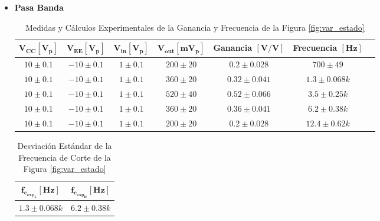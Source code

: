 \begin{itemize}
            \item \textbf{Pasa Banda}
            
            \begin{table}[H]
              \centering
              \begin{tabular}{|c|c|c|c|c|c|c|}
                \hline
                $\mathbf{V_{CC} [V_p]}$ & $\mathbf{V_{EE} [V_p]}$ & $\mathbf{V_{in} [V_p]}$ & $\mathbf{V_{out} [mV_p]}$ & \textbf{Ganancia} $\mathbf{[V/V]}$ & \textbf{Frecuencia} $\mathbf{[Hz]}$ \\
                \hline
                $10 \pm 0.1$ & $-10 \pm 0.1$ & $1 \pm 0.1$ & $200 \pm 20$ & $0.2 \pm 0.028$ & $700 \pm 49 $ \\
                \hline
                $10 \pm 0.1$ & $-10 \pm 0.1$ & $1 \pm 0.1$ & $360 \pm 20$ & $0.32 \pm 0.041$ & $1.3 \pm 0.068 k$ \\
                \hline
                $10 \pm 0.1$ & $-10 \pm 0.1$ & $1 \pm 0.1$ & $520 \pm 40 $ & $0.52 \pm 0.066$ & $3.5 \pm 0.25 k$ \\
                \hline
                $10 \pm 0.1$ & $-10 \pm 0.1$ & $1 \pm 0.1$ & $360 \pm 20$ & $0.36 \pm 0.041$ & $6.2 \pm 0.38 k$ \\
                \hline
                $10 \pm 0.1$ & $-10 \pm 0.1$ & $1 \pm 0.1$ & $200 \pm 20$ & $0.2 \pm 0.028$ & $12.4 \pm 0.62 k$ \\
                \hline
              \end{tabular}
              \caption{Medidas y Cálculos Experimentales de la Ganancia y Frecuencia de la Figura \ref{fig:var_estado}}
              \label{tab:exp_var_estado_pb}
            \end{table}

            \begin{table}[H]
              \centering
              \begin{tabular}{|c|c|}
                \hline
                $\mathbf{f_{c_{exp_L}} [Hz]}$ & $\mathbf{f_{c_{exp_H}} [Hz]}$  \\
                \hline
                $1.3 \pm 0.068 k$ & $6.2 \pm 0.38 k$ \\
                \hline
              \end{tabular}
              \caption{Desviación Estándar de la Frecuencia de Corte de la Figura \ref{fig:var_estado}}
              \label{tab:exp_var_estado_frecorte_pb}
            \end{table}


\end{itemize}
